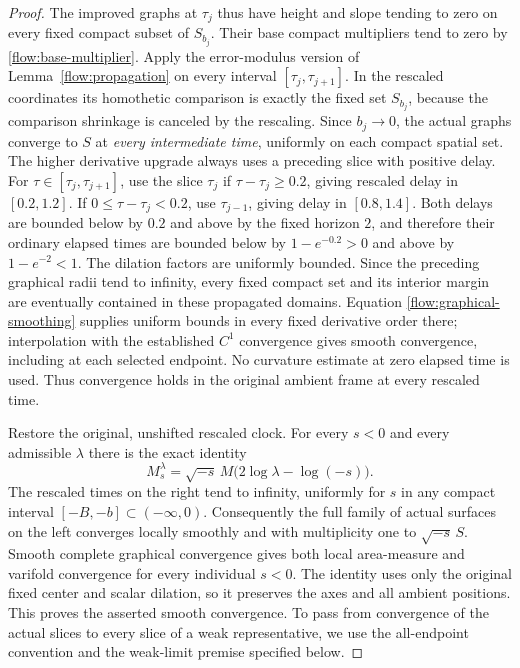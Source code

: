 \begin{proof}
The improved graphs at $\tau_j$ thus have height and slope
tending to zero on every fixed compact subset of $S_{b_j}$.
Their base compact multipliers tend to zero by
\eqref{flow:base-multiplier}.  Apply the error-modulus version
of Lemma~\ref{flow:propagation} on every interval
$[\tau_j,\tau_{j+1}]$.  In the rescaled coordinates its
homothetic comparison is exactly the fixed set $S_{b_j}$,
because the comparison shrinkage is canceled by the rescaling.
Since $b_j\to0$, the actual graphs converge to $S$ at
\emph{every intermediate time}, uniformly on each compact
spatial set.  The higher derivative upgrade always uses a preceding slice with
positive delay.  For $\tau\in[\tau_j,\tau_{j+1}]$, use the slice
$\tau_j$ if $\tau-\tau_j\ge0.2$, giving rescaled delay in
$[0.2,1.2]$.  If $0\le\tau-\tau_j<0.2$, use $\tau_{j-1}$,
giving delay in $[0.8,1.4]$.  Both delays are bounded below by
$0.2$ and above by the fixed horizon $2$, and therefore their
ordinary elapsed times are bounded below by $1-e^{-0.2}>0$
and above by $1-e^{-2}<1$.  The dilation factors are uniformly
bounded.  Since the preceding graphical radii tend to infinity,
every fixed compact set and its interior margin are eventually
contained in these propagated domains.  Equation
\eqref{flow:graphical-smoothing} supplies uniform bounds in every
fixed derivative order there; interpolation with the established
$C^1$ convergence gives smooth convergence, including at each
selected endpoint.  No curvature estimate at zero elapsed time is
used.  Thus convergence holds in the original ambient frame at
every rescaled time.

Restore the original, unshifted rescaled clock.  For every
$s<0$ and every admissible $\lambda$ there is the exact identity
\begin{equation}\label{flow:negative-time-identity}
 M_s^\lambda
 =\sqrt{-s}\,M\bigl(2\log\lambda-\log(-s)\bigr).
\end{equation}
The rescaled times on the right tend to infinity, uniformly
for $s$ in any compact interval $[-B,-b]\subset(-\infty,0)$.
Consequently the full family of actual surfaces on the left
converges locally smoothly and with multiplicity one to
$\sqrt{-s}\,S$.  Smooth complete graphical convergence gives
both local area-measure and varifold convergence for every
individual $s<0$.  The identity uses only the original fixed
center and scalar dilation, so it preserves the axes and all
ambient positions.  This proves the asserted smooth convergence.
To pass from convergence of the actual slices to every slice of a
weak representative, we use the all-endpoint convention and the
weak-limit premise specified below.
\end{proof}

